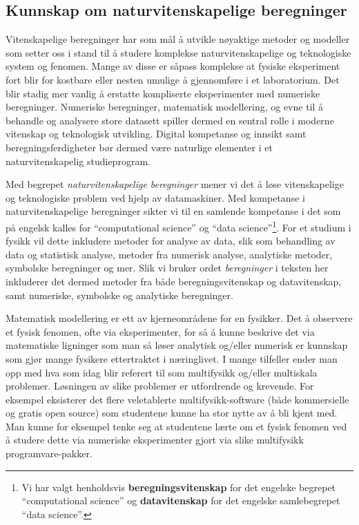 \documentclass{article}
\begin{document}
\subsection{Kunnskap om naturvitenskapelige beregninger}
Vitenskapelige beregninger har som mål å utvikle nøyaktige metoder og modeller som setter oss i stand til å studere komplekse naturvitenskapelige og teknologiske system og fenomen. Mange av disse er såpass komplekse at fysiske eksperiment fort blir for kostbare eller nesten umulige å gjennomføre i et laboratorium. Det blir stadig mer vanlig å erstatte kompliserte eksperimenter med numeriske beregninger. Numeriske beregninger, matematisk modellering, og evne til å behandle og analysere store datasett spiller dermed en sentral rolle i moderne vitenskap og teknologisk utvikling. Digital kompetanse og innsikt samt beregningsferdigheter bør dermed være naturlige elementer i et naturvitenskapelig studieprogram.

Med begrepet \emph{naturvitenskapelige beregninger} mener vi det å løse vitenskapelige og teknologiske problem ved hjelp av datamaskiner.
Med kompetanse i naturvitenskapelige beregninger sikter vi til en samlende kompetanse i det som på engelsk kalles for ``computational science'' og ``data science''\footnote{Vi har valgt henholdsvis {\bf beregningsvitenskap} for det engelske begrepet ``computational science'' og {\bf datavitenskap} for det engelske samlebegrepet ``data science''.}. For et studium i fysikk vil dette inkludere metoder for analyse av data, slik som behandling av data og statistisk analyse, metoder fra numerisk analyse, analytiske metoder, symbolske beregninger og mer. Slik vi bruker ordet \emph{beregninger} i teksten her inkluderer det dermed metoder fra både beregningsvitenskap og datavitenskap, samt numeriske, symbolske og analytiske beregninger.

Matematisk modellering er ett av kjerneområdene for en fysikker. Det å observere et fysisk fenomen, ofte via eksperimenter, for så å kunne beskrive det via matematiske ligninger som man så løser analytisk og/eller numerisk er kunnskap som gjør mange fysikere ettertraktet i næringlivet. I mange tilfeller ender man opp med hva som idag blir referert til som multifysikk og/eller multiskala problemer.
Løsningen av slike problemer er utfordrende og krevende.
For eksempel eksisterer det flere veletablerte  multifysikk-software (både kommersielle og gratis open source) som studentene kunne ha stor nytte av å bli kjent med.
Man kunne for eksempel tenke seg at studentene lærte om et fysisk fenomen ved å studere dette via numeriske eksperimenter gjort via slike multifysikk programvare-pakker.
\end{document}
